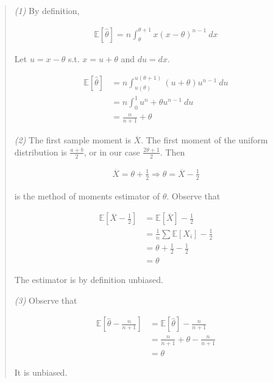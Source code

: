 \documentclass[a4paper, 12pt]{article}
\begin{document}
\small
\begin{quote}

\textit{(1)} By definition, 

\begin{align*}
    \mathbb{E}\left[ \hat{\theta} \right] = n\int_{\theta}^{\theta+1} x(x -
    \theta)^{n-1} ~ dx
\end{align*}

Let $u = x - \theta$ s.t. $x = u + \theta$ and $du = dx$. 

\begin{align*}
    \mathbb{E}\left[ \hat{\theta} \right] &= n\int_{u(\theta)}^{u(\theta+1)} (u +
    \theta)u^{n-1} ~ du \\ 
                                          &= n\int_{0}^{1} u^{n} + \theta u^{n-1}
                                          ~ du \\ 
                                          &= \frac{n}{n+1} + \theta
\end{align*}

\textit{(2)} The first sample moment is $\overline{X}$. The first moment of the
uniform distribution is $\frac{a + b}{2}$, or in our case $\frac{2\theta +
1}{2}$. Then 

\begin{align*}
    \overline{X} = \theta + \frac{1}{2} \Rightarrow \theta = \overline{X} -
    \frac{1}{2}
\end{align*}

is the method of moments estimator of $\theta$. Observe that 

\begin{align*}
    \mathbb{E}\left[ \overline{X} - \frac{1}{2} \right] &= \mathbb{E}\left[
    \overline{X} \right] -\frac{1}{2} \\ 
                                                        &= \frac{1}{n}\sum \mathbb{E}
                                                        \left[ X_i \right]  -
                                                        \frac{1}{2} \\ 
                                                        &= \theta + \frac{1}{2}
                                                        - \frac{1}{2} \\ 
                                                        &= \theta
\end{align*}

The estimator is by definition unbiased. 

\textit{(3)} Observe that 

\begin{align*}
    \mathbb{E} \left[ \hat{\theta} - \frac{n}{n+1} \right] &= \mathbb{E}\left[
    \hat{\theta} \right]  - \frac{n}{n+1} \\ 
                                                           &= \frac{n}{n+1} +
                                                           \theta -
                                                           \frac{n}{n+1} \\ 
                                                           &= \theta
\end{align*}

It is unbiased.

\end{quote}
\normalsize
\end{document}
